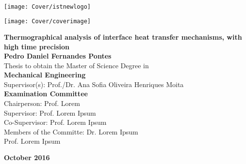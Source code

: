 \setcounter{page}{1} 


\thispagestyle{empty}
\begin{flushleft} ~\\ \vspace{-12mm} \hspace{-12mm}  \texttt{[image: Cover/istnewlogo]} 
\vspace{10mm}
\\ \begin{center} \texttt{[image: Cover/coverimage]}  \end{center} %
 \vspace{5mm}
\centering
\LARGE \textbf{Thermographical analysis of interface heat transfer mechanisms, with high time precision}
\\ \vspace{15mm}
\Large \textbf{Pedro Daniel Fernandes Pontes} \\
\vspace{12mm}
\large Thesis to obtain the Master of Science Degree in
\\ \vspace{2mm}
\LARGE \textbf{Mechanical Engineering}
\\ \vspace{10mm}
\large Supervisor(s): Prof./Dr. Ana Sofia Oliveira Henriques Moita 
\\ \vspace{15mm}
\Large \textbf{Examination Committee}
\\ \vspace{5mm}
\large Chairperson:	Prof. Lorem \\
\large Supervisor: Prof. Lorem Ipsum\\
\large Co-Supervisor: Prof. Lorem Ipsum \\
\large Members of the Committe: Dr. Lorem Ipsum \\
Prof. Lorem Ipsum
 
\vspace{15mm}

\Large \textbf{October 2016} \\
\let\thepage\relax
\end{flushleft}
\pagebreak


\clearpage

\thispagestyle{empty}
\cleardoublepage

\setcounter{page}{1} 

\baselineskip 18pt %
